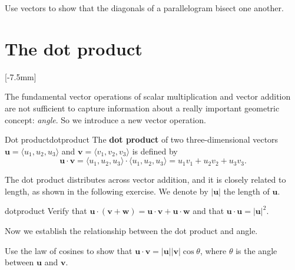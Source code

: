 \documentclass[svgnames]{report}
\begin{document}
\begin{exercise}{}{}
  Use vectors to show that the diagonals of a parallelogram bisect one
  another. 
\end{exercise}

\section{The dot product}

[-7.5mm]

The fundamental vector operations of scalar multiplication and vector
addition are not sufficient to capture information about a really important
geometric concept: \textit{angle}. So we introduce a new vector
operation.

\begin{defn}{Dot product}{dotproduct}
The \textbf{dot product} of two three-dimensional vectors $\mathbf{u}
= \langle u_1, u_2, u_3 \rangle$
and $\mathbf{v} =  \langle v_1, v_2, v_3 \rangle$ is defined by 
\[
\mathbf{u} \cdot \mathbf{v} = \langle u_1, u_2, u_3 \rangle \cdot \langle u_1, u_2, u_3 \rangle =
u_1 v_1 + u_2  v_2+ u_3v_3. 
\]
\end{defn}

The dot product distributes across vector addition, and it is closely
related to length, as shown in the following exercise. We denote by
$|\mathbf{u}|$ the length of $\mathbf{u}$. 

\begin{exercise}{}{dotproduct}
  Verify that $\mathbf{u} \cdot (\mathbf{v} + \mathbf{w}) = \mathbf{u} \cdot
  \mathbf{v} + \mathbf{u} \cdot \mathbf{w}$ and that $\mathbf{u} \cdot
  \mathbf{u} = |\mathbf{u}|^2$.
\end{exercise}

Now we establish the relationship between the dot product and angle. 

\begin{example}{}{}
  Use the law of cosines to show that $\mathbf{u} \cdot \mathbf{v} =
  |\mathbf{u}| |\mathbf{v}| \cos\theta$, where $\theta$ is the angle
  between $\mathbf{u}$ and $\mathbf{v}$. 
\end{example}
\end{document}
